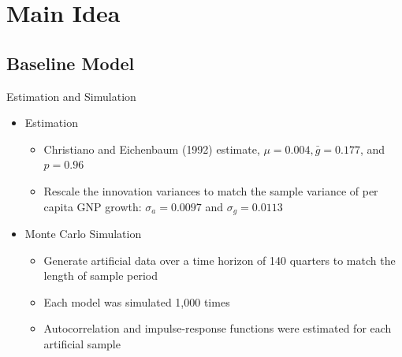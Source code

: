 \documentclass[10pt]{beamer}
\begin{document}
\section{Main Idea}
\subsection{Baseline Model}

\begin{frame}{Estimation and Simulation}
    \begin{itemize}
        \item Estimation
              \begin{itemize}
                  \item Christiano and Eichenbaum (1992) estimate, $\mu = 0.004, \bar{g} = 0.177$, and
                        $p = 0.96$
                  \item Rescale the innovation variances to match the sample variance of per capita GNP
                        growth: $\sigma_a = 0.0097$ and $\sigma_g = 0.0113$
              \end{itemize}
        \item Monte Carlo Simulation
              \begin{itemize}
                  \item Generate artificial data over a time horizon of 140 quarters to match the
                        length of sample period
                  \item Each model was simulated 1,000 times
                  \item Autocorrelation and impulse-response functions were estimated for each
                        artificial sample
              \end{itemize}

    \end{itemize}
\end{frame}
\end{document}
